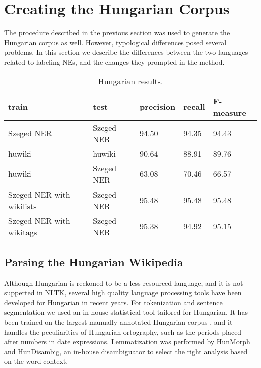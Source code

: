 \documentclass[11pt]{article}
\begin{document}
\section{Creating the Hungarian Corpus}
\label{sec:hun}

The procedure described in the previous section was used to generate the
Hungarian corpus as well. However, typological differences posed several
problems. In this section we describe the differences between the two
languages related to labeling NEs, and the changes they prompted in the
method.

\begin{table*}[ht]
\begin{center}
\begin{tabular}{lllll}
\hline \bf train & \bf test & \bf precision & \bf recall & \bf F-measure \\ \hline
Szeged NER & Szeged NER & 94.50 & 94.35 & 94.43 \\
huwiki & huwiki & 90.64 & 88.91 &  89.76 \\
huwiki & Szeged NER & 63.08 & 70.46 & 66.57 \\
Szeged NER with wikilists & Szeged NER & 95.48 & 95.48 & 95.48 \\
Szeged NER with wikitags & Szeged NER & 95.38 & 94.92 & 95.15 \\
\hline
\end{tabular}
\end{center}
\caption{\label{huresults} Hungarian results.}
\end{table*}

\subsection{Parsing the Hungarian Wikipedia}

Although Hungarian is reckoned to be a less resourced language, and it is not
supperted in NLTK, several high quality language processing tools have been
developed for Hungarian in recent years. For tokenization and sentence
segmentation we used an in-house statistical tool tailored for Hungarian. It
has been trained on the largest manually annotated Hungarian corpus
\cite{Csendes:04}, and it handles the peculiarities of Hungarian ortography,
such as the periods placed after numbers in date expressions. Lemmatization
was performed by HunMorph \cite{Tron:05} and HunDisambig, an in-house
disambiguator to select the right analysis based on the word context.

\end{document}
